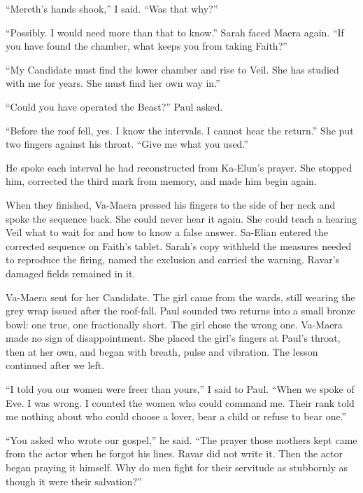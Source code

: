 ``Mereth's hands shook,'' I said. ``Was that why?''\par

``Possibly. I would need more than that to know.'' Sarah faced Maera again. ``If you have found the chamber, what keeps you from taking Faith?''\par

``My Candidate must find the lower chamber and rise to Veil. She has studied with me for years. She must find her own way in.''\par

``Could you have operated the Beast?'' Paul asked.\par

``Before the roof fell, yes. I know the intervals. I cannot hear the return.'' She put two fingers against his throat. ``Give me what you used.''\par

He spoke each interval he had reconstructed from Ka-Elun's prayer. She stopped him, corrected the third mark from memory, and made him begin again.\par

When they finished, Va-Maera pressed his fingers to the side of her neck and spoke the sequence back. She could never hear it again. She could teach a hearing Veil what to wait for and how to know a false answer. Sa-Elian entered the corrected sequence on Faith's tablet. Sarah's copy withheld the measures needed to reproduce the firing, named the exclusion and carried the warning. Ravar's damaged fields remained in it.\par

Va-Maera sent for her Candidate. The girl came from the wards, still wearing the grey wrap issued after the roof-fall. Paul sounded two returns into a small bronze bowl: one true, one fractionally short. The girl chose the wrong one. Va-Maera made no sign of disappointment. She placed the girl's fingers at Paul's throat, then at her own, and began with breath, pulse and vibration. The lesson continued after we left.\par

``I told you our women were freer than yours,'' I said to Paul. ``When we spoke of Eve. I was wrong. I counted the women who could command me. Their rank told me nothing about who could choose a lover, bear a child or refuse to bear one.''\par

``You asked who wrote our gospel,'' he said. ``The prayer those mothers kept came from the actor when he forgot his lines. Ravar did not write it. Then the actor began praying it himself. Why do men fight for their servitude as stubbornly as though it were their salvation?''\par

